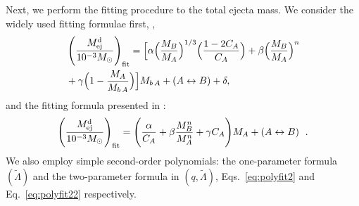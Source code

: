 Next, we perform the fitting procedure to the total ejecta mass. 
We consider the widely used fitting formulae first, 
\citep{Kawaguchi:2016ana,Dietrich:2016fpt,Radice:2018pdn}, 
%
\begin{eqnarray}
\label{eq:fit_Mej}
&\left(\frac{M^{\text{d}}_{\text{ej}}}{10^{-3}M_{\odot}}\right)_{\rm fit} =
\Big[\alpha\Big(\frac{M_B}{M_A}\Big)^{1/3}\Big(\frac{1-2C_A}{C_A}\Big)+  
\beta\Big(\frac{M_B}{M_A}\Big)^n \\
&+ \gamma\Big(1-\frac{M_A}{M_{b\,A}} \Big)\Big]M_{b\,A} + (A\leftrightarrow B) + \delta\nonumber,
\end{eqnarray}
%
and the fitting formula presented in \citet{Kruger:2020gig}:
%
\begin{equation}
\label{eq:fit_Mej_Kruger}
\left(\frac{M^{\text{d}}_{\text{ej}}}{10^{-3}M_{\odot}}\right)_{\rm fit} =
\left(\frac{\alpha}{C_A} + \beta\frac{M_B ^n}{M_A ^n} + \gamma
C_A\Bigg)M_A + (A\leftrightarrow B)\right. \ .
\end{equation}
%
We also employ simple second-order polynomials: 
the one-parameter formula $(\tilde\Lambda)$ and the two-parameter
formula in $(q,\tilde\Lambda)$, 
Eqs.~\eqref{eq:polyfit2} and Eq.~\eqref{eq:polyfit22}
respectively.  %
%

